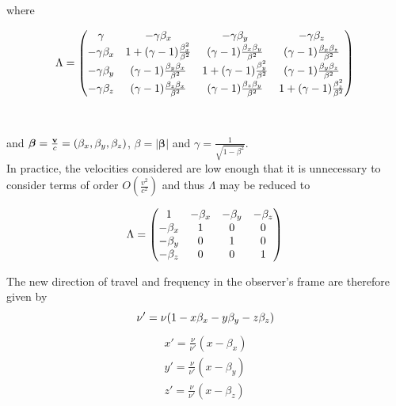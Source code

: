 \noindent where 

\begin{equation}
	{\Lambda}=
	 \begin{pmatrix} 
	 \gamma & -\gamma \beta_x & -\gamma \beta_y & -\gamma \beta_z \\
	-\gamma \beta_x & 1+(\gamma-1)\frac{\beta_x^2}{\beta^2} & 
	(\gamma-1)\frac{\beta_x \beta_y}{\beta^2} & (\gamma-1)\frac{\beta_x \beta_z}{\beta^2} \\
	-\gamma \beta_y  & (\gamma-1)\frac{\beta_y \beta_x}{\beta^2} & 1+(\gamma-1)\frac{\beta_y^2}{\beta^2} 
	& (\gamma-1)\frac{\beta_y \beta_z}{\beta^2}\\
	-\gamma \beta_z & (\gamma-1)\frac{\beta_z \beta_x}{\beta^2} & (\gamma-1)\frac{\beta_z \beta_y}{\beta^2} 
	& 1+(\gamma-1)\frac{\beta_z^2}{\beta^2} \\
	 \end{pmatrix}
	 \\
\end{equation}
\\
\\
 \noindent and $\boldsymbol{\beta}=\frac{{\bf{v}}}{c}=(\beta_x,\beta_y,\beta_z)$,   $\beta=\lvert \boldsymbol{\beta}\rvert$ and $\gamma = \frac{1}{\sqrt{1-\beta^2}}$.
 \\

In practice, the velocities considered are low enough that it is unnecessary to consider terms of order $O(\frac{v^2}{c^2})$ and thus ${\Lambda}$ may be reduced to

\begin{equation}
	{\Lambda}=
	 \begin{pmatrix} 
	 1 & - \beta_x & - \beta_y & - \beta_z \\
	- \beta_x & 1 & 0 & 0 \\
	- \beta_y  & 0 & 1 & 0\\
	- \beta_z & 0 & 0 & 1 \\
	 \end{pmatrix}
	 \\
\end{equation}

\noindent The new direction of travel and frequency in the observer's frame are therefore given by  
\begin{equation}
\nu'=\nu(1-x\beta_x-y\beta_y-z\beta_z) \\
\end{equation}
\begin{equation*}
\begin{split}
x'=\frac{\nu}{\nu'}(x-\beta_x) \\
y'=\frac{\nu}{\nu'}(x-\beta_y) \\
z'=\frac{\nu}{\nu'}(x-\beta_z) \\
\end{split}
\end{equation*}

